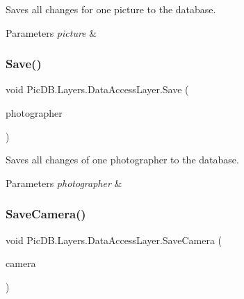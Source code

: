 Saves all changes for one picture to the database. 


\begin{DoxyParams}{Parameters}
{\em picture} & \\
\hline
\end{DoxyParams}
\mbox{\label{class_pic_d_b_1_1_layers_1_1_data_access_layer_a4e3554f691b1aae313a9c1162ccd3bee}} 
\subsubsection{\texorpdfstring{Save()}{Save()}\hspace{0.1cm}{\footnotesize\ttfamily [2/2]}}
{\footnotesize\ttfamily void Pic\+D\+B.\+Layers.\+Data\+Access\+Layer.\+Save (\begin{DoxyParamCaption}\item[{I\+Photographer\+Model}]{photographer }\end{DoxyParamCaption})}



Saves all changes of one photographer to the database. 


\begin{DoxyParams}{Parameters}
{\em photographer} & \\
\hline
\end{DoxyParams}
\mbox{\label{class_pic_d_b_1_1_layers_1_1_data_access_layer_af7dbcbd6f4ef0058b7b33a052eca4c06}} 
\subsubsection{\texorpdfstring{Save\+Camera()}{SaveCamera()}}
{\footnotesize\ttfamily void Pic\+D\+B.\+Layers.\+Data\+Access\+Layer.\+Save\+Camera (\begin{DoxyParamCaption}\item[{\mbox{\hyperlink{class_pic_d_b_1_1_models_1_1_camera_model}{Camera\+Model}}}]{camera }\end{DoxyParamCaption})}



